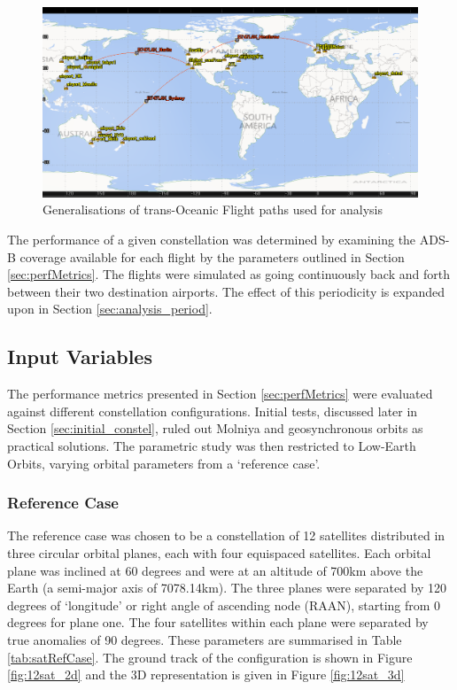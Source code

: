 \begin{figure}[H]
	\centering
	\includegraphics[scale = 0.55]{Pictures/transoceanicGeneralisations.png}
	
	\caption{Generalisations of trans-Oceanic Flight paths used for analysis}
	\label{fig:transoceanicGeneralisations}
\end{figure} 

The performance of a given constellation was determined by examining the ADS-B coverage available for each flight by the parameters outlined in Section \ref{sec:perfMetrics}. The flights were simulated as going continuously back and forth between their two destination airports. The effect of this periodicity is expanded upon in Section \ref{sec:analysis_period}.

\subsection{Input Variables}
The performance metrics presented in Section \ref{sec:perfMetrics} were evaluated against different constellation configurations. Initial tests, discussed later in Section \ref{sec:initial_constel}, ruled out Molniya and geosynchronous orbits as practical solutions. The parametric study was then restricted to Low-Earth Orbits, varying orbital parameters from a `reference case'.

\subsubsection{Reference Case} \label{sec:ref_case}
The reference case was chosen to be a constellation of 12 satellites distributed in three circular orbital planes, each with four equispaced satellites. Each orbital plane was inclined at 60 degrees and were at an altitude of 700km above the Earth (a semi-major axis of 7078.14km). The three planes were separated by 120 degrees of `longitude' or  right angle of ascending node (RAAN), starting from 0 degrees for plane one. The four satellites within each plane were separated by true anomalies of 90 degrees. These parameters are summarised in Table \ref{tab:satRefCase}. The ground track of the configuration is shown in Figure \ref{fig:12sat_2d} and the 3D representation is given in Figure \ref{fig:12sat_3d}

